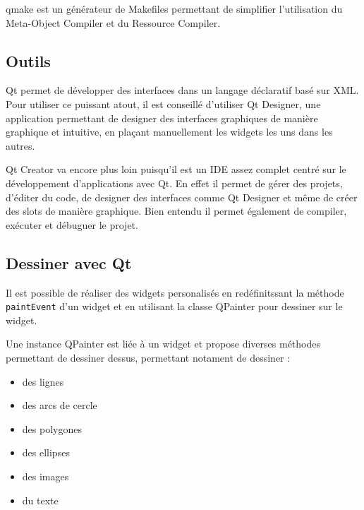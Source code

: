 qmake est un générateur de Makefiles permettant de simplifier l'utilisation du Meta-Object Compiler et du Ressource Compiler.

\subsection{Outils}

Qt permet de développer des interfaces dans un langage déclaratif basé sur XML. Pour utiliser ce puissant atout, il est conseillé d'utiliser Qt Designer, une application permettant de designer des interfaces graphiques de manière graphique et intuitive, en plaçant manuellement les widgets les uns dans les autres.

Qt Creator va encore plus loin puisqu'il est un IDE assez complet centré sur le développement d'applications avec Qt. En effet il permet de gérer des projets, d'éditer du code, de designer des interfaces comme Qt Designer et même de créer des slots de manière graphique. Bien entendu il permet également de compiler, exécuter et débuguer le projet.

\subsection{Dessiner avec Qt}

Il est possible de réaliser des widgets personalisés en redéfinitssant la méthode \verb|paintEvent| d'un widget et en utilisant la classe QPainter pour dessiner sur le widget.

Une instance QPainter est liée à un widget et propose diverses méthodes  permettant de dessiner dessus, permettant notament de dessiner :
\begin{itemize}
	\item des lignes
	\item des arcs de cercle
	\item des polygones
	\item des ellipses
	\item des images
	\item du texte
\end{itemize}

